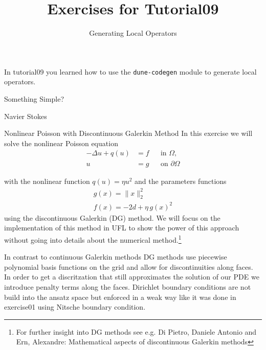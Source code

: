 \documentclass[12pt,a4paper]{article}
\title{\textbf{Exercises for Tutorial09}}
\subtitle{Generating Local Operators}
\begin{document}
\exerciseheader

In tutorial09 you learned how to use the \lstinline{dune-codegen} module to
generate local operators.

\begin{Exercise}{Something Simple?}
\end{Exercise}

\begin{Exercise}{Navier Stokes}

\end{Exercise}

\begin{Exercise}{Nonlinear Poisson with Discontinuous Galerkin Method}
  In this exercise we will solve the nonlinear Poisson equation
  \begin{equation}
    \begin{aligned}
      -\Delta u + q(u) &= f &&\text{in $\Omega$},\\
      u &= g &&\text{on $\partial\Omega$}
    \end{aligned}
    \label{eq:nonlinear_poisson}
  \end{equation}

  with the nonlinear function $q(u)=\eta u^2$ and the parameters functions
  \begin{align*}
    g(x) = \|x\|_2^2 \\
    f(x) = -2d + \eta \, g(x)^2
  \end{align*}
  using the discontinuous Galerkin
  (DG) method. We will focus on the implementation of this method in UFL to
  show the power of this approach without going into details about the
  numerical method.\footnote{For further insight into DG methods see e.g. Di Pietro, Daniele Antonio and Ern, Alexandre: Mathematical aspects of discontinuous Galerkin methods}

  In contrast to continuous Galerkin methods DG methods use piecewise
  polynomial basis functions on the grid and allow for discontinuities along
  faces. In order to get a discritzation that still approximates the solution
  of our PDE we introduce penalty terms along the faces. Dirichlet boundary
  conditions are not build into the ansatz space but enforced in a weak way
  like it was done in exercise01 using Nitsche boundary condition.


\end{Exercise}
\end{document}
